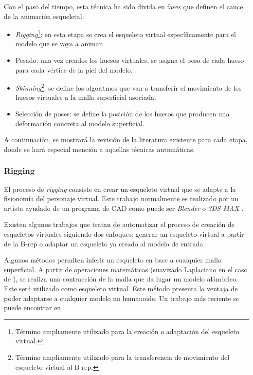 Con el paso del tiempo, esta técnica ha sido divida en fases que definen el cauce de la animación esqueletal:

\begin{itemize}
    \item \emph{Rigging}\footnote{Término ampliamente utilizado para la creación o adaptación del esqueleto virtual.}: en esta etapa se crea el esqueleto virtual específicamente para el modelo que se vaya a animar.
    \item Pesado: una vez creados los huesos virtuales, se asigna el peso %
    de cada hueso para cada vértice de la piel del modelo.
    \item \emph{Skinning}\footnote{Término ampliamente utilizado para la transferencia de movimiento del esqueleto virtual al \acs{B-rep}.}: se define los algoritmos que van a transferir el movimiento de los huesos virtuales a la malla superficial asociada. 
    \item Selección de poses: se define la posición de los huesos que producen una deformación concreta al modelo superficial.
\end{itemize}

A continuación, se mostrará la revisión de la literatura existente para cada etapa, donde se hará especial mención a aquellas técnicas automáticas.


\subsubsection{Rigging}
\label{art:rigging}

El proceso de \emph{rigging} consiste en crear un esqueleto virtual que se adapte a la fisionomía del personaje virtual. Este trabajo normalmente es realizado por un artista ayudado de un programa de \ac{CAD} como puede ser \emph{Blender} \cite{blender} o \emph{3DS MAX} \cite{3ds}. 

Existen algunos trabajos que tratan de automatizar el proceso de creación de esqueletos virtuales siguiendo dos enfoques: generar un esqueleto virtual a partir de la \ac{B-rep} o adaptar un esqueleto ya creado al modelo de entrada.

Algunos métodos permiten inferir un esqueleto en base a cualquier malla superficial. A partir de operaciones matemáticas (suavizado Laplaciano en el caso de \cite{laplacian}), se realiza una contracción de la malla que da lugar un modelo alámbrico. Este será utilizado como esqueleto virtual. Este método presenta la ventaja de poder adaptarse a cualquier modelo no humanoide. Un trabajo más reciente se puede encontrar en \cite{Tagliasacchi}.

